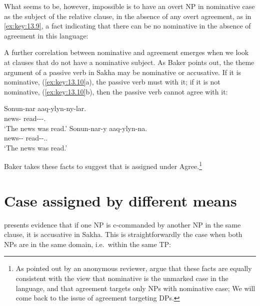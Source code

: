 \documentclass[output=paper]{langsci/langscibook}
\begin{document}
What seems to be, however, impossible is to have an overt NP in nominative case
as the subject of the relative clause, in the absence of any overt agreement,
as in \eqref{ex:key:13.9}, a fact indicating that there can be no nominative in the
absence of agreement in this language:

\ea%
    \label{ex:key:13.9} \parencite[30]{Baker2015}
\z

A further correlation between nominative and agreement emerges when we look at
clauses that do not have a nominative subject. As Baker points out, the theme
argument of a passive verb in Sakha may be nominative or accusative. If it is
nominative, (\ref{ex:key:13.10}a), the passive verb must  with it; if it
is not nominative, (\ref{ex:key:13.10}b), then the passive verb cannot agree
with it:

\ea%
    \label{ex:key:13.10} \parencite[32]{Baker2015}
	\ea
	\gll  Sonun-nar aaq-ylyn-ny-lar.\\
    news-\Pl{}  read-\Pass{}-\Pst{}-\Tpl.\Sbj{}\\
	\glt     ‘The news was read.’
	\ex
	\gll  Sonun-nar-y aaq-ylyn-na.\\
	    news-\Pl{}-\Acc{}  read-\Pass{}-\Pst{}.\Tsg.\Sbj{}\\
	\glt     ‘The news was read.’
    \z
\z

Baker takes these facts to suggest that \Nom{} is assigned under
Agree.\footnote{As pointed out by an anonymous reviewer, \citet{LevPre2015}
    argue that these facts are equally consistent with the view that nominative
    is the unmarked case in the language, and that agreement targets only NPs
with nominative case; We will come back to the issue of agreement targeting \Nom{}
DPs.}

\section{Case assigned by different means}\label{sec:key:13.3}

\textcite[112f.]{Baker2015} presents evidence that if one NP is c-commanded by
another NP in the same clause, it is accusative in Sakha. This is
straightforwardly the case when both NPs are in the same domain, i.e.\ within
the same TP:
\end{document}
